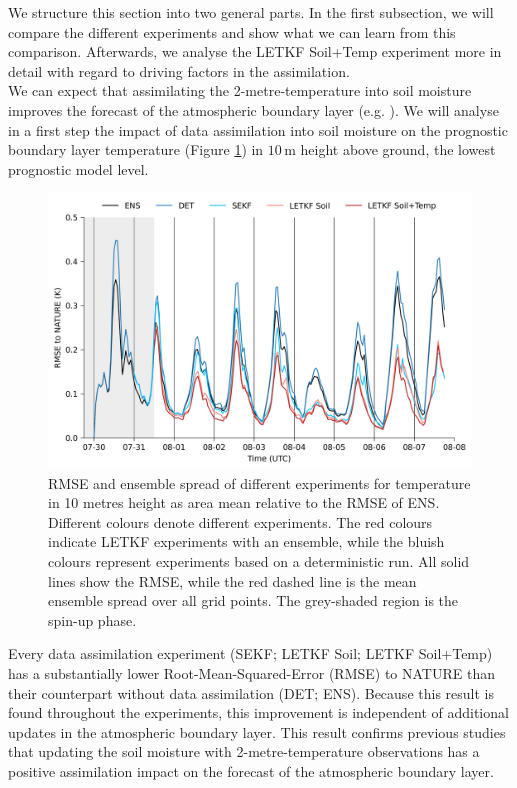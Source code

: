 \documentclass[hess, manuscript]{copernicus}
\begin{document}
We structure this section into two general parts.
In the first subsection, we will compare the different experiments and show what we can learn from this comparison.
Afterwards, we analyse the LETKF Soil+Temp experiment more in detail with regard to driving factors in the assimilation.\\

We can expect that assimilating the 2-metre-temperature into soil moisture improves the forecast of the atmospheric boundary layer (e.g. \citet{carrera_assimilation_2019}). 
We will analyse in a first step the impact of data assimilation into soil moisture on the prognostic boundary layer temperature (Figure \ref{fig:err_t_long}) in $10\,\text{m}$ height above ground, the lowest prognostic model level.

\begin{figure}[ht]
	\includegraphics[width=\textwidth]{figures/fig_04_err_t_long.png}
	\caption{
		RMSE and ensemble spread of different experiments for temperature in 10 metres height as area mean relative to the RMSE of ENS.
		Different colours denote different experiments.
		The red colours indicate LETKF experiments with an ensemble, while the bluish colours represent experiments based on a deterministic run.
		All solid lines show the RMSE, while the red dashed line is the mean ensemble spread over all grid points.
		The grey-shaded region is the spin-up phase.
	}
	\label{fig:err_t_long}
\end{figure}

Every data assimilation experiment (SEKF; LETKF Soil; LETKF Soil+Temp) has a substantially lower Root-Mean-Squared-Error (RMSE) to NATURE than their counterpart without data assimilation (DET; ENS).
Because this result is found throughout the experiments, this improvement is independent of additional updates in the atmospheric boundary layer.
This result confirms previous studies that updating the soil moisture with 2-metre-temperature observations has a positive assimilation impact on the forecast of the atmospheric boundary layer.
\end{document}

